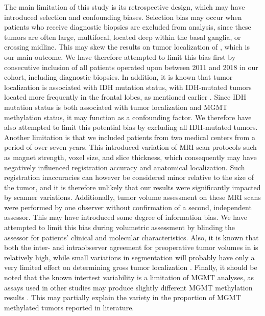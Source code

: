 The main limitation of this study is its retrospective design, which may have introduced selection and confounding biases.
Selection bias may occur when patients who receive diagnostic biopsies are excluded from analysis, since these \glspl{tumor} are often large, multifocal, located deep within the basal ganglia, or crossing midline.
This may skew the results on \gls{tumor} localization of , which is our main outcome.
We have therefore attempted to limit this bias first by consecutive inclusion of all  patients operated upon between 2011 and 2018 in our cohort, including diagnostic biopsies.
In addition, it is known that \gls{tumor} localization is associated with \gls{IDH} mutation status, with \gls{IDH}-mutated \glspl{tumor} located more frequently in the frontal lobes, as mentioned earlier \autocite{lai2011evidence}.
Since \gls{IDH} mutation status is both associated with \gls{tumor} localization and \gls{MGMT} methylation status, it may function as a confounding factor.
We therefore have also attempted to limit this potential bias by excluding all \gls{IDH}-mutated \glspl{tumor}.
Another limitation is that we included patients from two medical centers from a period of over seven years.
This introduced variation of \gls{MRI} scan protocols such as magnet strength, voxel size, and slice thickness, which consequently may have negatively influenced registration accuracy and anatomical localization.
Such registration inaccuracies can however be considered minor relative to the size of the \gls{tumor}, and it is therefore unlikely that our results were significantly impacted by scanner variations.
Additionally, \gls{tumor} volume assessment on these \gls{MRI} scans were performed by one observer without confirmation of a second, independent assessor.
This may have introduced some degree of information bias.
We have attempted to limit this bias during volumetric assessment by blinding the assessor for patients' clinical and molecular characteristics.
Also, it is known that both the inter- and intraobserver agreement for preoperative \gls{tumor} volumes in  is relatively high, while small variations in segmentation will probably have only a very limited effect on determining gross \gls{tumor} localization \autocite{kubben2010intraobserver}.
Finally, it should be noted that the known intertest variability is a limitation of \gls{MGMT} analyses, as assays used in other studies may produce slightly different \gls{MGMT} methylation results \autocite{wick2014mgmt}.
This may partially explain the variety in the proportion of \gls{MGMT} methylated \glspl{tumor} reported in literature.

